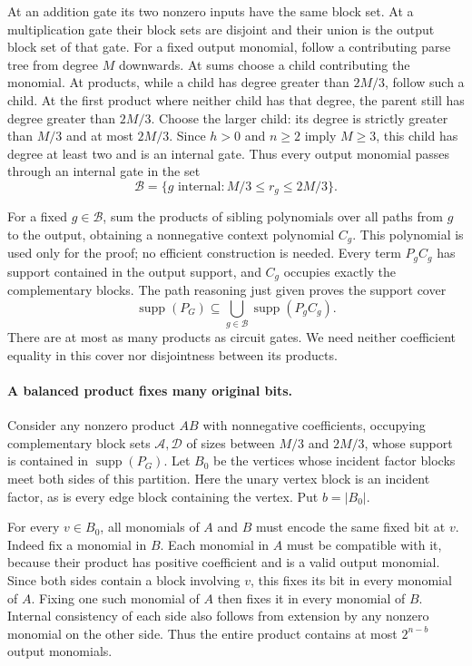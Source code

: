At an addition gate its two nonzero inputs have the same
block set. At a multiplication gate their block sets are
disjoint and their union is the output block set of that gate.
For a fixed output monomial, follow a contributing parse tree
from degree $M$ downwards. At sums choose a child contributing
the monomial. At products, while a child has degree greater
than $2M/3$, follow such a child. At the first product where
neither child has that degree, the parent still has degree
greater than $2M/3$. Choose the larger child: its degree is
strictly greater than $M/3$ and at most $2M/3$. Since
$h>0$ and $n\ge2$ imply $M\ge3$, this child has degree at
least two and is an internal gate. Thus every output monomial
passes through an internal gate
in the set
\[
             \mathcal B=\{g\text{ internal}:M/3\le r_g\le2M/3\}.
\]

For a fixed $g\in\mathcal B$, sum the products of sibling
polynomials over all paths from $g$ to the output, obtaining
a nonnegative context polynomial $C_g$. This polynomial is
used only for the proof; no efficient construction is needed.
Every term $P_gC_g$ has support contained in the output
support, and $C_g$ occupies exactly the complementary blocks.
The path reasoning just given proves the support cover
\begin{equation}\label{eq:S019-cover}
 \operatorname{supp}(P_G)\subseteq
       \bigcup_{g\in\mathcal B}\operatorname{supp}(P_gC_g).
\end{equation}
There are at most as many products as circuit gates. We need
neither coefficient equality in this cover nor disjointness
between its products.

\paragraph{A balanced product fixes many original bits.}
Consider any nonzero product $AB$ with nonnegative coefficients,
occupying complementary block sets $\mathcal A,\mathcal D$ of
sizes between $M/3$ and $2M/3$, whose support is contained in
$\operatorname{supp}(P_G)$. Let $B_0$ be the vertices whose
incident factor blocks meet both sides of this partition.
Here the unary vertex block is an incident factor, as is every
edge block containing the vertex. Put $b=|B_0|$.

For every $v\in B_0$, all monomials of $A$ and $B$ must
encode the same fixed bit at $v$. Indeed fix a monomial in
$B$. Each monomial in $A$ must be compatible with it, because
their product has positive coefficient and is a valid output
monomial. Since both sides contain a block involving $v$,
this fixes its bit in every monomial of $A$. Fixing one such
monomial of $A$ then fixes it in every monomial of $B$.
Internal consistency of each side also follows from extension
by any nonzero monomial on the other side. Thus the entire
product contains at most $2^{n-b}$ output monomials.

